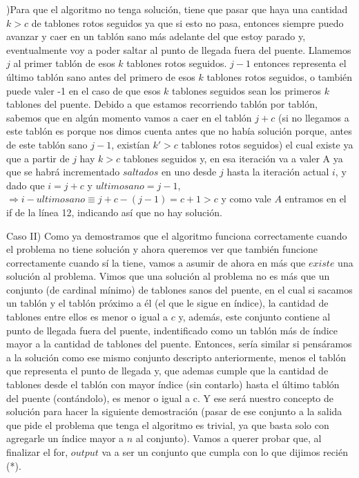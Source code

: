 \documentclass{article}
\begin{document}
)Para que el algoritmo no tenga soluci\'on, tiene que pasar que haya una cantidad $k > c$ de tablones rotos seguidos ya que si esto no pasa, entonces siempre puedo avanzar y caer en un tabl\'on sano m\'as adelante del que estoy parado y, eventualmente voy a poder saltar al punto de llegada fuera del puente.
Llamemos $j$ al primer tabl\'on de esos $k$ tablones rotos seguidos. $j-1$ entonces representa el \'ultimo tabl\'on sano antes del primero de esos $k$ tablones rotos seguidos, o tambi\'en puede valer -1 en el caso de que esos $k$ tablones seguidos sean los primeros $k$ tablones del puente.
\newline Debido a que estamos recorriendo tabl\'on por tabl\'on, sabemos que en alg\'un momento vamos a caer en el tabl\'on $j + c$ (si no llegamos a este tabl\'on es porque nos dimos cuenta antes que no hab\'ia soluci\'on porque, antes de este tabl\'on sano $j - 1$, exist\'ian $k' > c$ tablones rotos seguidos) el cual existe ya que a partir de $j$ hay $k > c$ tablones seguidos y, en esa iteraci\'on va a valer A ya que se habr\'a incrementado $saltados$ en uno desde $j$ hasta la iteraci\'on actual $i$, y dado que $i = j + c$ y $ultimosano = j - 1 $, $ \Rightarrow i - ultimosano \equiv  j + c - (j - 1) =  c + 1 > c$ y como vale $A$ entramos en el if de la l\'inea 12, indicando as\'i que no hay soluci\'on.

\vspace{1cm} \noindent Caso II) Como ya demostramos que el algoritmo funciona correctamente cuando el problema no tiene soluci\'on y ahora queremos ver que tambi\'en funcione correctamente cuando s\'i la tiene, vamos a asumir de ahora en m\'as que $existe$ una soluci\'on al problema.
\newline Vimos que una soluci\'on al problema no es m\'as que un conjunto (de cardinal m\'inimo) de tablones sanos del puente, en el cual si sacamos un tabl\'on y el tabl\'on pr\'oximo a \'el (el que le sigue en \'indice), la cantidad de tablones entre ellos es menor o igual a $c$ y, adem\'as, este conjunto contiene al punto de llegada fuera del puente, indentificado como un tabl\'on m\'as de \'indice mayor a la cantidad de tablones del puente. Entonces, ser\'ia similar si pens\'aramos a la soluci\'on como ese mismo conjunto descripto anteriormente, menos el tabl\'on que representa el punto de llegada y, que ademas cumple que la cantidad de tablones desde el tabl\'on con mayor \'indice (sin contarlo) hasta el \'ultimo tabl\'on del puente (cont\'andolo), es menor o igual a c. Y ese ser\'a nuestro concepto de soluci\'on para hacer la siguiente demostraci\'on (pasar de ese conjunto a la salida que pide el problema que tenga el algoritmo es trivial, ya que basta solo con agregarle un \'indice mayor a $n$ al conjunto).
\newline Vamos a querer probar que, al finalizar el for, $output$ va a ser un conjunto que cumpla con lo que dijimos reci\'en (*).
\end{document}
